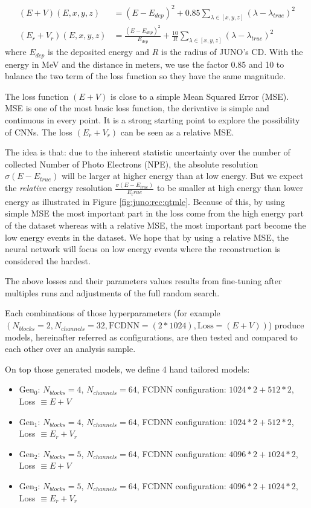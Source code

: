 \documentclass[../main.tex]{subfiles}
\begin{document}
{{\begin{align}
  (E+V)(E, x, y, z) &= (E - E_{dep})^2 + 0.85 \sum_{\lambda \in [x, y, z]} (\lambda - \lambda_{true})^2 \\
  (E_r + V_r)(E, x, y, z) &=  \frac{(E - E_{dep}) ^ 2}{E_{dep}} + \frac{10}{R} \sum_{\lambda \in [x, y, z]} (\lambda - \lambda_{true})^2
\end{align}
where $E_{dep}$ is the deposited energy and $R$ is the radius of JUNO's CD. With the energy in MeV and the distance in meters, we use the factor 0.85 and 10 to balance the two term of the loss function so they have the same magnitude.


The loss function $(E+V)$ is close to a simple Mean Squared Error (MSE). MSE is one of the most basic loss function, the derivative is simple and continuous in every point. It is a strong starting point to explore the possibility of CNNs. The loss $(E_r + V_r)$ can be seen as a relative MSE.

The idea is that: due to the inherent statistic uncertainty over the number of collected Number of Photo Electrons (NPE), the absolute resolution $\sigma (E - E_{true})$ will be larger at higher energy than at low energy. But we expect the \textit{relative} energy resolution $\frac{\sigma(E - E_{true})}{E_true}$ to be smaller at high energy than lower energy as illustrated in Figure \ref{fig:juno:rec:qtmle}. Because of this, by using simple MSE the most important part in the loss come from the high energy part of the dataset whereas with a relative MSE, the most important part become the low energy events in the dataset. We hope that by using a relative MSE, the neural network will focus on low energy events where the reconstruction is considered the hardest.


The above losses and their parameters values results from fine-tuning after multiples runs and adjustments of the full random search.


Each combinations of those hyperparameters (for example $(N_{blocks} = 2, N_{channels} = 32, \mathrm{FCDNN} = (2 * 1024), \mathrm{Loss} = (E+V))$) produce models, hereinafter referred as configurations, are then tested and compared to each other over an analysis sample.

On top those generated models, we define 4 hand tailored models:
\begin{itemize}
  \item $\mathrm{Gen}_0$: $N_{blocks} = 4$, $N_{channels} = 64$, FCDNN configuration: $1024 * 2 + 512 * 2$, Loss $\equiv E+V$
  \item $\mathrm{Gen}_1$: $N_{blocks} = 4$, $N_{channels} = 64$, FCDNN configuration: $1024 * 2 + 512 * 2$, Loss $\equiv E_r+V_r$
  \item $\mathrm{Gen}_2$: $N_{blocks} = 5$, $N_{channels} = 64$, FCDNN configuration: $4096 * 2 + 1024 * 2$, Loss $\equiv E+V$
  \item $\mathrm{Gen}_3$: $N_{blocks} = 5$, $N_{channels} = 64$, FCDNN configuration: $4096 * 2 + 1024 * 2$, Loss $\equiv E_r+V_r$
\end{itemize}

}}
\end{document}
